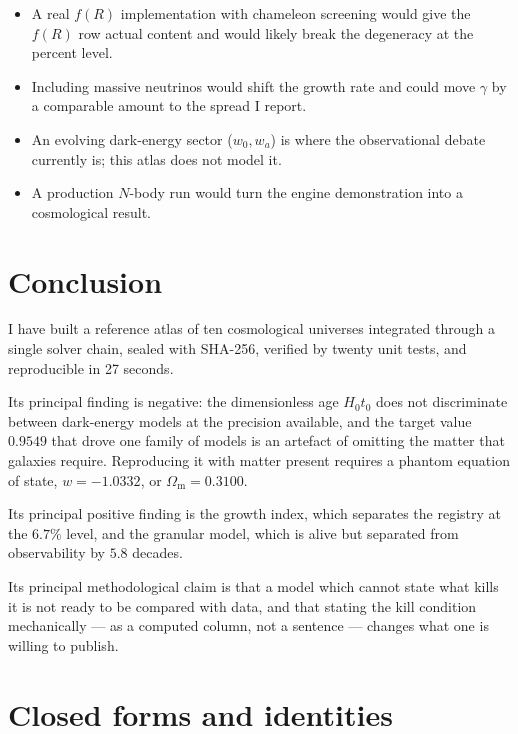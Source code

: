 \documentclass[11pt,a4paper]{article}
\theoremstyle{definition}
\newcommand{\Omm}{\Omega_{\mathrm{m}}}
\newcommand{\gamm}{\gamma}
\begin{document}
\begin{itemize}
\item A real $f(R)$ implementation with chameleon screening would give the
      $f(R)$ row actual content and would likely break the degeneracy at the
      percent level.
\item Including massive neutrinos would shift the growth rate and could move
      $\gamm$ by a comparable amount to the spread I report.
\item An evolving dark-energy sector ($w_0, w_a$) is where the observational
      debate currently is; this atlas does not model it.
\item A production $N$-body run would turn the engine demonstration into a
      cosmological result.
\end{itemize}

\section{Conclusion}
\label{sec:conclusion}

I have built a reference atlas of ten cosmological universes integrated
through a single solver chain, sealed with SHA-256, verified by twenty unit
tests, and reproducible in 27 seconds.

Its principal finding is negative: the dimensionless age $H_0t_0$ does not
discriminate between dark-energy models at the precision available, and the
target value $0.9549$ that drove one family of models is an artefact of
omitting the matter that galaxies require. Reproducing it with matter present
requires a phantom equation of state, $w = -1.0332$, or $\Omm = 0.3100$.

Its principal positive finding is the growth index, which separates the
registry at the $6.7\%$ level, and the granular model, which is alive but
separated from observability by $5.8$ decades.

Its principal methodological claim is that a model which cannot state what
kills it is not ready to be compared with data, and that stating the kill
condition mechanically --- as a computed column, not a sentence --- changes
what one is willing to publish.

\appendix

\section{Closed forms and identities}
\label{app:closed}
\end{document}
